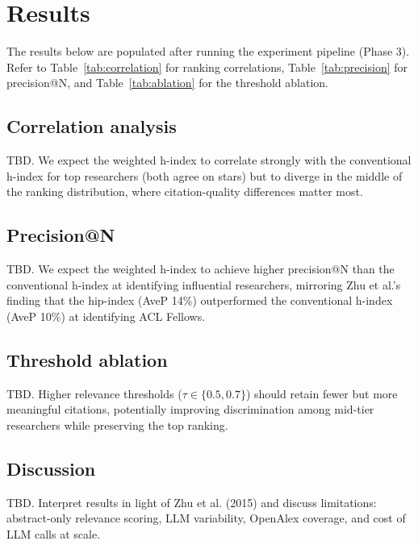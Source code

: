 \section{Results}

The results below are populated after running the experiment pipeline (Phase 3). Refer to Table~\ref{tab:correlation} for ranking correlations, Table~\ref{tab:precision} for precision@N, and Table~\ref{tab:ablation} for the threshold ablation.

\subsection{Correlation analysis}

TBD. We expect the weighted h-index to correlate strongly with the conventional h-index for top researchers (both agree on stars) but to diverge in the middle of the ranking distribution, where citation-quality differences matter most.

\subsection{Precision@N}

TBD. We expect the weighted h-index to achieve higher precision@N than the conventional h-index at identifying influential researchers, mirroring Zhu et al.'s finding that the hip-index (AveP 14\%) outperformed the conventional h-index (AveP 10\%) at identifying ACL Fellows.

\subsection{Threshold ablation}

TBD. Higher relevance thresholds ($\tau \in \{0.5, 0.7\}$) should retain fewer but more meaningful citations, potentially improving discrimination among mid-tier researchers while preserving the top ranking.

\subsection{Discussion}

TBD. Interpret results in light of Zhu et al. (2015) and discuss limitations: abstract-only relevance scoring, LLM variability, OpenAlex coverage, and cost of LLM calls at scale.
